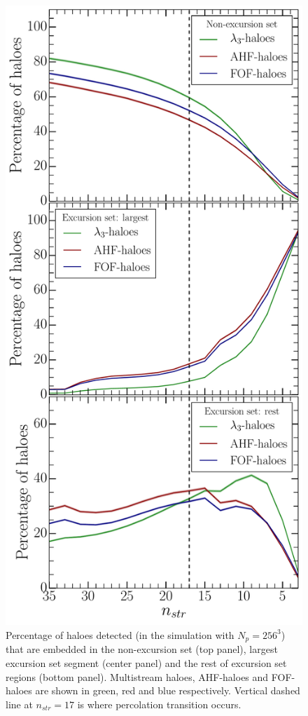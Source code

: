 \begin{figure}
\begin{minipage}[t]{.99\linewidth}
  \centering\includegraphics[width=10.cm]{Chapter5/Source_v2/fig14.pdf} 
\end{minipage}\hfill
\caption{ Percentage of haloes detected (in the simulation with $N_p = 256^3$) that are embedded in the non-excursion set (top panel), largest excursion set segment (center panel) and the rest of excursion set regions (bottom panel). Multistream haloes, AHF-haloes and FOF-haloes are shown in green, red and blue respectively. Vertical dashed line at $n_{str} = 17$ is where percolation transition occurs. }
\label{fig:HaloFilAll}
\end{figure}


